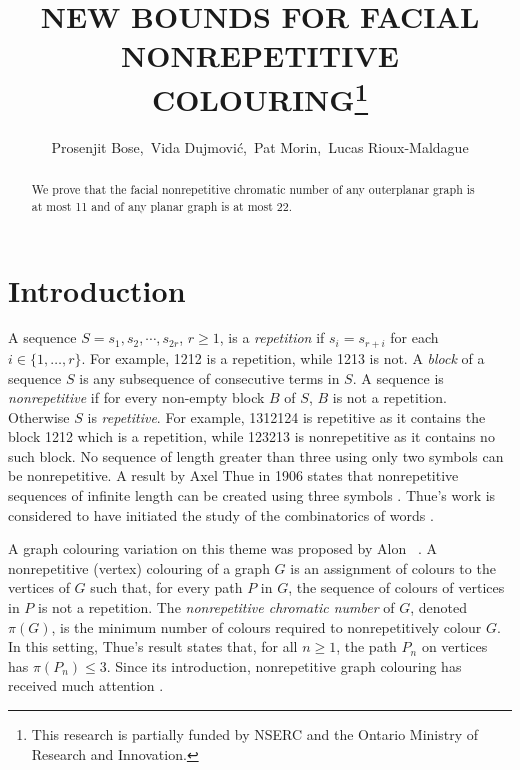 \documentclass{patmorin}
\title{\MakeUppercase{New Bounds for Facial Nonrepetitive Colouring}\thanks{This research is partially funded by NSERC and the Ontario Ministry of Research and Innovation.}}
\author{Prosenjit Bose,\, Vida Dujmovi\'c,\, Pat Morin,\, Lucas Rioux-Maldague}
\begin{document}
\maketitle


\begin{abstract}
  We prove that the facial nonrepetitive chromatic number of any outerplanar graph is at most 11 and of any planar graph is at most 22.
\end{abstract}


\section{Introduction}

A sequence $S=s_1,s_2,\cdots,s_{2r}$, $r\ge 1$, is a \emph{repetition}
if $s_i=s_{r+i}$ for each $i\in\{1,\ldots,r\}$. For example, 1212
is a repetition, while 1213 is not. A \emph{block} of a sequence
$S$ is any subsequence of consecutive terms in $S$. A sequence
is \emph{nonrepetitive} if for every non-empty block $B$ of $S$,
$B$ is not a repetition. Otherwise $S$ is \emph{repetitive}. For
example, 1312124 is repetitive as it contains the block 1212 which is a
repetition, while 123213 is nonrepetitive as it contains no such block.
No sequence of length greater than three using only two symbols can be
nonrepetitive. A result by Axel Thue in 1906 states that nonrepetitive
sequences of infinite length can be created using three symbols
\cite{thue1906uber}. Thue's work is considered to have initiated the
study of the combinatorics of words \cite{allouche1999ubiquitous}.

A graph colouring variation on this theme was proposed by Alon
\etal\ \cite{alon2002nonrepetitive}.  A nonrepetitive (vertex) colouring
of a graph $G$ is an assignment of colours to the vertices of $G$ such
that, for every path $P$ in $G$, the sequence of colours of vertices
in $P$ is not a repetition.  The \emph{nonrepetitive chromatic number}
of $G$, denoted $\pi(G)$, is the minimum number of colours required to
nonrepetitively colour $G$.  In this setting, Thue's result states that,
for all $n\ge 1$, the path $P_n$ on vertices has $\pi(P_n)\le 3$.
Since its introduction, nonrepetitive
graph colouring has received much attention \cite{barat2013facial,
barat2007square, barat2008note, brevsar2007nonrepetitive,
currie2002cycle18, dujmovic2012planarlogn, dujmovic2011nonrepetitive,
fiorenzi2011thue, gagol2016pathwidth, gonccalves2014entropy,
grytczuk2007nonrepetitivesurvey, grytczuk2007nonrepetitive,
grytczuk2013new, harant2012nonrepetitive, kozik2013nonrepetitive,
kundgen2008nonrepetitive, pezarski2009non, przybylo2013facial,
schreyer2012facial, schreyer2013total}.
\end{document}
